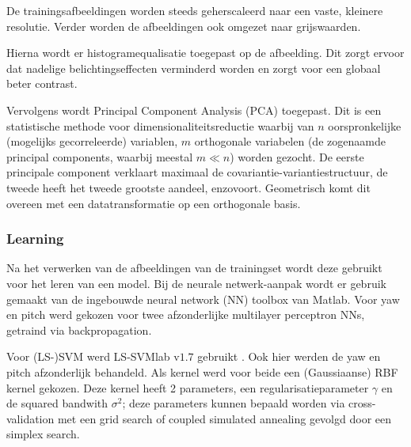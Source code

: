 \documentclass[a4paper,dutch,11pt,]{scrartcl}
\begin{document}
De trainingsafbeeldingen worden steeds geherscaleerd naar een vaste, kleinere resolutie. 
Verder worden de afbeeldingen ook omgezet naar grijswaarden. %

Hierna wordt er histogramequalisatie toegepast op de afbeelding. Dit zorgt ervoor dat nadelige belichtingseffecten verminderd worden en zorgt voor een globaal beter contrast. 

Vervolgens wordt Principal Component Analysis (PCA) \cite{stat} toegepast. Dit is een statistische methode voor dimensionaliteitsreductie waarbij van $n$ oorspronkelijke (mogelijks gecorreleerde) variablen, $m$ orthogonale variabelen (de zogenaamde principal components, waarbij meestal $m\ll n$) worden gezocht. De eerste principale component verklaart maximaal de covariantie-variantiestructuur, de tweede heeft het tweede grootste aandeel, enzovoort. Geometrisch komt dit overeen met een datatransformatie op een orthogonale basis.




\subsubsection{Learning}
Na het verwerken van de afbeeldingen van de trainingset wordt deze gebruikt voor het leren van een model.
Bij de neurale netwerk-aanpak wordt er gebruik gemaakt van de ingebouwde neural network (NN) toolbox van Matlab. 
Voor yaw en pitch werd gekozen voor twee afzonderlijke multilayer perceptron NNs, getraind via backpropagation.

Voor (LS-)SVM werd LS-SVMlab v$1.7$ gebruikt \cite{suykens2002least}. Ook hier werden de yaw en pitch afzonderlijk behandeld. Als kernel werd voor beide een (Gaussiaanse) RBF kernel gekozen. Deze kernel heeft 2 parameters, een regularisatieparameter $\gamma$ en de squared bandwith $\sigma^2$; deze parameters kunnen bepaald worden via cross-validation met een grid search of coupled simulated annealing gevolgd door een simplex search.
\end{document}
